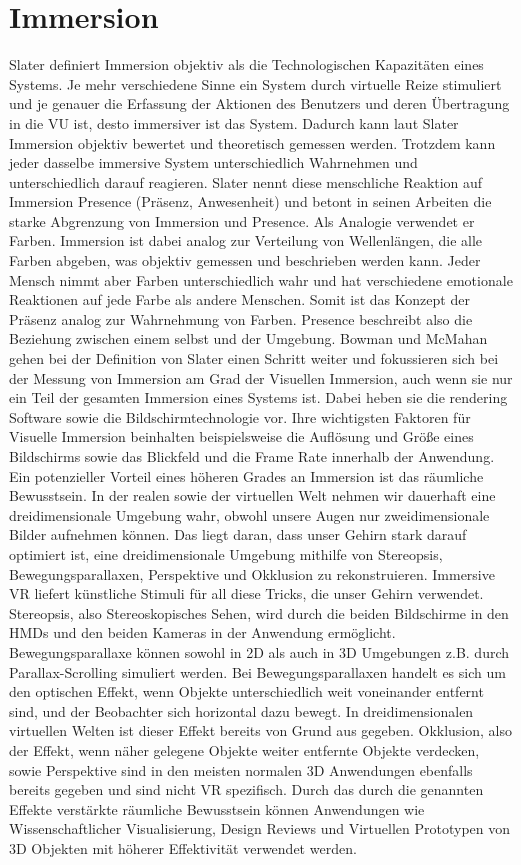 \section{Immersion}
Slater\cite{Slater2003}\cite{Slater1999} definiert Immersion objektiv als die Technologischen Kapazitäten eines Systems. Je mehr verschiedene Sinne ein System durch virtuelle Reize stimuliert und je genauer die Erfassung der Aktionen des Benutzers und deren Übertragung in die VU ist, desto immersiver ist das System. Dadurch kann laut Slater Immersion objektiv bewertet und theoretisch gemessen werden. Trotzdem kann jeder dasselbe immersive System unterschiedlich Wahrnehmen und unterschiedlich darauf reagieren. Slater nennt diese menschliche Reaktion auf Immersion Presence (Präsenz, Anwesenheit) und betont in seinen Arbeiten die starke Abgrenzung von Immersion und Presence. Als Analogie verwendet er Farben. Immersion ist dabei analog zur Verteilung von Wellenlängen, die alle Farben abgeben, was objektiv gemessen und beschrieben werden kann. Jeder Mensch nimmt aber Farben unterschiedlich wahr und hat verschiedene emotionale Reaktionen auf jede Farbe als andere Menschen. Somit ist das Konzept der Präsenz analog zur Wahrnehmung von Farben. Presence beschreibt also die Beziehung zwischen einem selbst und der Umgebung.
Bowman und McMahan\cite{Bowman2007} gehen bei der Definition von Slater einen Schritt weiter und fokussieren sich bei der Messung von Immersion am Grad der Visuellen Immersion, auch wenn sie nur ein Teil der gesamten Immersion eines Systems ist. Dabei heben sie die rendering Software sowie die Bildschirmtechnologie vor. Ihre wichtigsten Faktoren für Visuelle Immersion beinhalten beispielsweise die Auflösung und Größe eines Bildschirms sowie das Blickfeld und die Frame Rate innerhalb der Anwendung.
Ein potenzieller Vorteil eines höheren Grades an Immersion ist das räumliche Bewusstsein. In der realen sowie der virtuellen Welt nehmen wir dauerhaft eine dreidimensionale Umgebung wahr, obwohl unsere Augen nur zweidimensionale Bilder aufnehmen können. Das liegt daran, dass unser Gehirn stark darauf optimiert ist, eine dreidimensionale Umgebung mithilfe von Stereopsis, Bewegungsparallaxen, Perspektive und Okklusion zu rekonstruieren. 
Immersive VR liefert künstliche Stimuli für all diese Tricks, die unser Gehirn verwendet. Stereopsis, also Stereoskopisches Sehen, wird durch die beiden Bildschirme in den HMDs und den beiden Kameras in der Anwendung ermöglicht. Bewegungsparallaxe können sowohl in 2D als auch in 3D Umgebungen z.B. durch Parallax-Scrolling simuliert werden. Bei Bewegungsparallaxen handelt es sich um den optischen Effekt, wenn Objekte unterschiedlich weit voneinander entfernt sind, und der Beobachter sich horizontal dazu bewegt. In dreidimensionalen virtuellen Welten ist dieser Effekt bereits von Grund aus gegeben. Okklusion, also der Effekt, wenn näher gelegene Objekte weiter entfernte Objekte verdecken, sowie Perspektive sind in den meisten normalen 3D Anwendungen ebenfalls bereits gegeben und sind nicht VR spezifisch.
Durch das durch die genannten Effekte verstärkte räumliche Bewusstsein können Anwendungen wie Wissenschaftlicher Visualisierung, Design Reviews und Virtuellen Prototypen von 3D Objekten mit höherer Effektivität verwendet werden.

